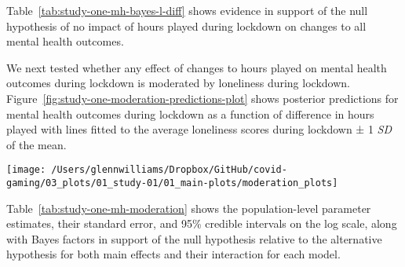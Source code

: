 \documentclass[
  english,
  man,floatsintext]{apa6}
\begin{document}
Table~\ref{tab:study-one-mh-bayes-l-diff} shows evidence in support of the null hypothesis of no impact of hours played during lockdown on changes to all mental health outcomes.

We next tested whether any effect of changes to hours played on mental health outcomes during lockdown is moderated by loneliness during lockdown. Figure~\ref{fig:study-one-moderation-predictions-plot} shows posterior predictions for mental health outcomes during lockdown as a function of difference in hours played with lines fitted to the average loneliness scores during lockdown ± 1 \emph{SD} of the mean.

\begin{figure*}[!htbp]

{\centering \texttt{[image: /Users/glennwilliams/Dropbox/GitHub/covid-gaming/03\_plots/01\_study-01/01\_main-plots/moderation\_plots]} 

}

\caption{Mental health outcomes for the depression, anxiety, and stress measures as a function of the difference in hours played before and during lockdown and loneliness scores during lockdown. Lines and ribbons indicate the posterior mean ± 95\% credible intervals, with each line representing the mean loneliness score ± 1 SD.}\label{fig:study-one-moderation-predictions-plot}
\end{figure*}

Table~\ref{tab:study-one-mh-moderation} shows the population-level parameter estimates, their standard error, and 95\% credible intervals on the log scale, along with Bayes factors in support of the null hypothesis relative to the alternative hypothesis for both main effects and their interaction for each model.
\end{document}
